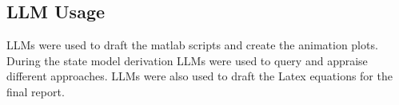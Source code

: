 \documentclass{article}
\begin{document}
\subsection{LLM Usage}
\label{subsec:llm usage}

LLMs were used to draft the matlab scripts and create the animation plots. During the state model derivation LLMs were used to query and appraise different approaches. LLMs were also used to draft the Latex equations for the final report. 
\end{document}
